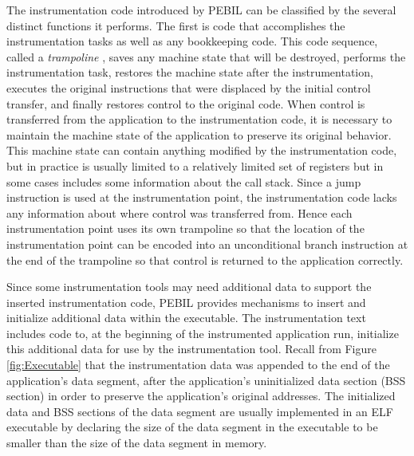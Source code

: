 The instrumentation code introduced by PEBIL can be classified by the several distinct functions it
performs. The first
is code that accomplishes the instrumentation tasks as well as any bookkeeping code.
This code sequence, called a \textit{trampoline} \cite{buck2000api}, 
saves any machine state that will be destroyed, performs the instrumentation task, restores
the machine state after the instrumentation, executes the
original instructions that were displaced by the initial control transfer,
and finally restores control to the original code. 
When control is transferred from the application to the
instrumentation code, it is necessary to maintain the machine state of
the application to preserve its original behavior. This machine state
can contain anything modified by the instrumentation code, but in practice is
usually limited to a relatively limited set of registers but in some cases includes
some information about the call stack. 
Since a jump instruction is used at the instrumentation point, the
instrumentation code lacks any information about where control was transferred from. Hence
each instrumentation point uses its own trampoline so that the location of the
instrumentation point can be encoded into an unconditional branch instruction
at the end of the trampoline so that control is returned to the application correctly.

Since some instrumentation tools may need additional data to support the inserted instrumentation code,
PEBIL provides mechanisms to insert and initialize additional data within the executable.
The instrumentation text includes code to, at the beginning of the instrumented 
application run, initialize this additional data for use by the
instrumentation tool. Recall from Figure \ref{fig:Executable} that the instrumentation
data was appended to the end of the application's data segment, after the
application's uninitialized data section (BSS section) in order to preserve the application's 
original addresses. The initialized data and BSS
sections of the data segment are usually implemented in an ELF executable by declaring the size of
the data segment in the executable to be smaller than the size of the data
segment in memory. 


